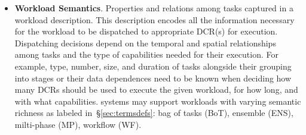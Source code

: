 \documentclass{sig-alternate}
\begin{document}
\begin{itemize}
\item \textbf{Workload Semantics}. Properties and relations among tasks captured
  in a workload description. This description encodes all the information
  necessary for the workload to be dispatched to appropriate DCR(s) for
  execution. Dispatching decisions depend on the temporal and spatial
  relationships among tasks and the type of capabilities needed for their
  execution. For example, type, number, size, and duration of tasks alongside
  their grouping into stages or their data dependences need to be known when
  deciding how many DCRs should be used to execute the given workload, for how
  long, and with what capabilities. \pilot systems may support workloads with
  varying semantic richness as labeled in~\S\ref{sec:termsdefs}: bag of tasks
  (BoT), ensemble (ENS), milti-phase (MP), workflow (WF).








\end{itemize}
\end{document}
